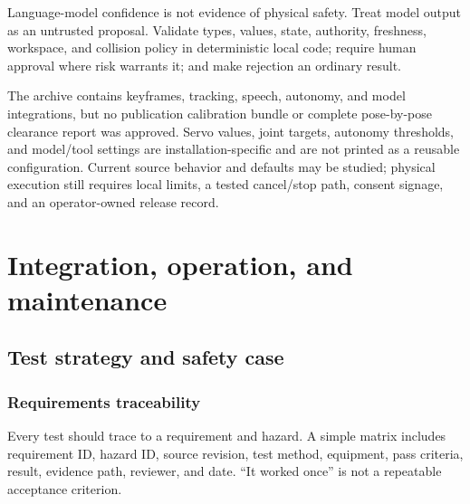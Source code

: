 \documentclass[10pt,openany]{book}
\begin{document}
\begin{safetybox}
Language-model confidence is not evidence of physical safety. Treat model output as an untrusted proposal. Validate types, values, state, authority, freshness, workspace, and collision policy in deterministic local code; require human approval where risk warrants it; and make rejection an ordinary result.
\end{safetybox}


\begin{fieldnotebox}[title={BEHAVIOR RECORD LIMIT}]
The archive contains keyframes, tracking, speech, autonomy, and model integrations, but no publication calibration bundle or complete pose-by-pose clearance report was approved. Servo values, joint targets, autonomy thresholds, and model/tool settings are installation-specific and are not printed as a reusable configuration. Current source behavior and defaults may be studied; physical execution still requires local limits, a tested cancel/stop path, consent signage, and an operator-owned release record.
\end{fieldnotebox}

\part{Integration, operation, and maintenance}


\chapter{Test strategy and safety case}

\section{Requirements traceability}

Every test should trace to a requirement and hazard. A simple matrix includes requirement ID, hazard ID, source revision, test method, equipment, pass criteria, result, evidence path, reviewer, and date. ``It worked once'' is not a repeatable acceptance criterion.
\end{document}
